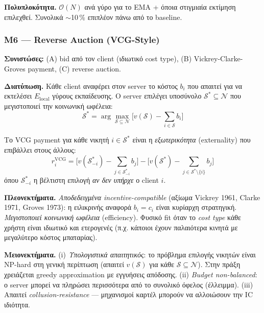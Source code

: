 \textbf{Πολυπλοκότητα.} $\mathcal{O}(N)$ ανά γύρο για το EMA + όποια στιγμιαία εκτίμηση επιλεχθεί.
Συνολικά $\sim$10\,\% επιπλέον πάνω από το baseline.

\subsubsection{M6 — Reverse Auction (VCG-Style)}
\label{subsubsec:M6_auction}

\textbf{Συνιστώσες:} (A) bid από τον client (ιδιωτικό cost type), (B) Vickrey-Clarke-Groves payment,
(C) reverse auction.

\textbf{Διατύπωση.} Κάθε client αναφέρει στον server το κόστος $b_i$ που απαιτεί για να εκτελέσει
$E_{\text{local}}$ γύρους εκπαίδευσης. Ο server επιλέγει υποσύνολο $\mathcal{S}^* \subseteq \mathcal N$
που μεγιστοποιεί την κοινωνική ωφέλεια:
\begin{equation}
    \mathcal{S}^* = \arg\max_{\mathcal{S} \subseteq \mathcal{N}}
                    \Big[v(\mathcal S) - \sum_{i \in \mathcal S} b_i\Big]
    \label{eq:M6_winners}
\end{equation}

Το VCG payment για κάθε νικητή $i \in \mathcal{S}^*$ είναι η \emph{εξωτερικότητα} (externality) που
επιβάλλει στους άλλους:
\begin{equation}
    r_i^{\text{VCG}} = \Big[v(\mathcal S^*_{-i}) - \sum_{j \in \mathcal S^*_{-i}} b_j\Big]
                    - \Big[v(\mathcal S^*) - \sum_{j \in \mathcal S^* \setminus \{i\}} b_j\Big]
    \label{eq:M6_vcg}
\end{equation}
όπου $\mathcal S^*_{-i}$ η βέλτιστη επιλογή \emph{αν δεν υπήρχε} ο client $i$.

\textbf{Πλεονεκτήματα.} \emph{Αποδεδειγμένα incentive-compatible} (αξίωμα Vickrey 1961, Clarke 1971,
Groves 1973): η ειλικρινής αναφορά $b_i = c_i$ είναι κυρίαρχη στρατηγική. \emph{Μεγιστοποιεί κοινωνική
ωφέλεια} (efficiency). Φυσικό fit όταν το \emph{cost type} κάθε χρήστη είναι ιδιωτικό και ετερογενές
(π.χ. κάποιοι έχουν παλαιότερα κινητά με μεγαλύτερο κόστος μπαταρίας).

\textbf{Μειονεκτήματα.} (i) \emph{Υπολογιστικά απαιτητικός}: το πρόβλημα επιλογής νικητών είναι
NP-hard στη γενική περίπτωση (απαιτεί $v(\mathcal S)$ για κάθε $\mathcal S \subseteq \mathcal N$). Στην
πράξη χρειάζεται greedy approximation με εγγυήσεις απόδοσης. (ii) \emph{Budget non-balanced}:
ο server μπορεί να πληρώσει περισσότερα από το συνολικό όφελος (έλλειμμα). (iii) Απαιτεί
\emph{collusion-resistance} — μηχανισμοί καρτέλ μπορούν να αλλοιώσουν την IC ιδιότητα.

